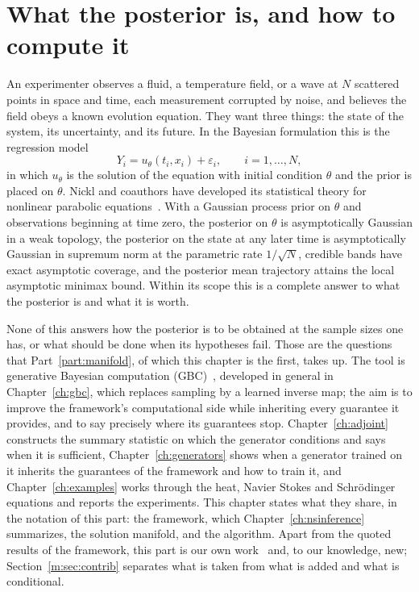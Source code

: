 \section{What the posterior is, and how to compute it}\label{m:sec:intro}

An experimenter observes a fluid, a temperature field, or a wave at $N$ scattered points in space and time, each measurement corrupted by noise, and believes the field obeys a known evolution equation. They want three things: the state of the system, its uncertainty, and its future. In the Bayesian formulation this is the regression model
\begin{equation}\label{m:eq:introm}
Y_i=u_\theta(t_i,x_i)+\varepsilon_i,\qquad i=1,\dots,N,
\end{equation}
in which $u_\theta$ is the solution of the equation with initial condition $\theta$ and the prior is placed on $\theta$. Nickl and coauthors have developed its statistical theory for nonlinear parabolic equations~\cite{nickltiti2024,nicklbvm2024,konennickl2026,nickl2025}. With a Gaussian process prior on $\theta$ and observations beginning at time zero, the posterior on $\theta$ is asymptotically Gaussian in a weak topology, the posterior on the state at any later time is asymptotically Gaussian in supremum norm at the parametric rate $1/\sqrt N$, credible bands have exact asymptotic coverage, and the posterior mean trajectory attains the local asymptotic minimax bound. Within its scope this is a complete answer to what the posterior is and what it is worth.

None of this answers how the posterior is to be obtained at the sample sizes one has, or what should be done when its hypotheses fail. Those are the questions that Part~\ref{part:manifold}, of which this chapter is the first, takes up. The tool is generative Bayesian computation (GBC)~\cite{polsonsokolov2025,polsonsokolov2026b}, developed in general in Chapter~\ref{ch:gbc}, which replaces sampling by a learned inverse map; the aim is to improve the framework's computational side while inheriting every guarantee it provides, and to say precisely where its guarantees stop. Chapter~\ref{ch:adjoint} constructs the summary statistic on which the generator conditions and says when it is sufficient, Chapter~\ref{ch:generators} shows when a generator trained on it inherits the guarantees of the framework and how to train it, and Chapter~\ref{ch:examples} works through the heat, Navier Stokes and Schr\"odinger equations and reports the experiments. This chapter states what they share, in the notation of this part: the framework, which Chapter~\ref{ch:nsinference} summarizes, the solution manifold, and the algorithm. Apart from the quoted results of the framework, this part is our own work~\cite{polsonsokolov2026manifold} and, to our knowledge, new; Section~\ref{m:sec:contrib} separates what is taken from what is added and what is conditional.

